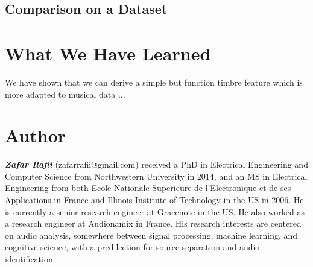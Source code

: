 \documentclass[journal]{IEEEtran}
\begin{document}
\subsection{Comparison on a Dataset}





\section{What We Have Learned}

We have shown that we can derive a simple but function timbre feature which is more adapted to musical data ...




\section{Author}

\textit{\textbf{Zafar Rafii}} (zafarrafii@gmail.com) received a PhD in Electrical Engineering and Computer Science from Northwestern University in 2014, and an MS in Electrical Engineering from both Ecole Nationale Superieure de l’Electronique et de ses Applications in France and Illinois Institute of Technology in the US in 2006. He is currently a senior research engineer at Gracenote in the US. He also worked as a research engineer at Audionamix in France. His research interests are centered on audio analysis, somewhere between signal processing, machine learning, and cognitive science, with a predilection for source separation and audio identification.



\end{document}
